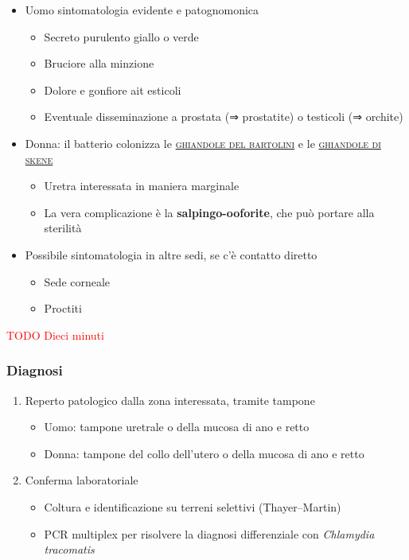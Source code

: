 \documentclass[italian,]{article}
\providecommand{\tightlist}{%
  \setlength{\itemsep}{0pt}\setlength{\parskip}{0pt}}
\renewcommand{\a}[1]{\underline{\textsc{#1}}}
\newcommand{\TODO}[1]{\textcolor{red}{\textsf{\footnotesize{TODO #1}}}} %
\begin{document}
\begin{itemize}
\tightlist
\item
  Uomo sintomatologia evidente e patognomonica

  \begin{itemize}
  \tightlist
  \item
    Secreto purulento giallo o verde
  \item
    Bruciore alla minzione
  \item
    Dolore e gonfiore ait esticoli
  \item
    Eventuale disseminazione a prostata (⇒ prostatite) o testicoli (⇒
    orchite)
  \end{itemize}
\item
  Donna: il batterio colonizza le \a{ghiandole del bartolini} e le
  \a{ghiandole di skene}

  \begin{itemize}
  \tightlist
  \item
    Uretra interessata in maniera marginale
  \item
    La vera complicazione è la \textbf{salpingo-ooforite}, che può
    portare alla sterilità
  \end{itemize}
\item
  Possibile sintomatologia in altre sedi, se c'è contatto diretto

  \begin{itemize}
  \tightlist
  \item
    Sede corneale
  \item
    Proctiti
  \end{itemize}
\end{itemize}

\TODO{Dieci minuti}

\hypertarget{diagnosi-5}{%
\subsubsection{Diagnosi}\label{diagnosi-5}}

\begin{enumerate}
\def\labelenumi{\arabic{enumi}.}
\tightlist
\item
  Reperto patologico dalla zona interessata, tramite tampone

  \begin{itemize}
  \tightlist
  \item
    Uomo: tampone uretrale o della mucosa di ano e retto
  \item
    Donna: tampone del collo dell'utero o della mucosa di ano e retto
  \end{itemize}
\item
  Conferma laboratoriale

  \begin{itemize}
  \tightlist
  \item
    Coltura e identificazione su terreni selettivi (Thayer--Martin)
  \item
    PCR multiplex per risolvere la diagnosi differenziale con
    \emph{Chlamydia tracomatis}
  \end{itemize}
\end{enumerate}
\end{document}
